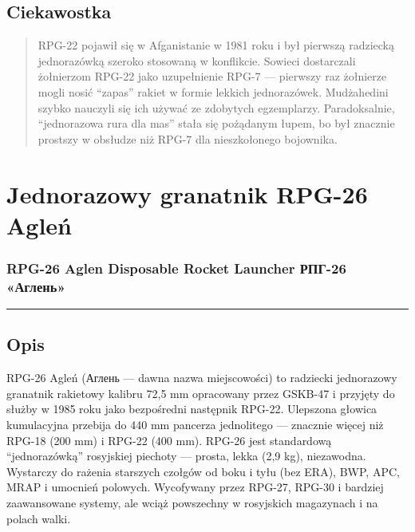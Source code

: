 \documentclass[12pt,openany,oneside]{book}
\begin{document}
\section{Ciekawostka}\label{ciekawostka-70}

\begin{quote}
RPG-22 pojawił się w Afganistanie w 1981 roku i był pierwszą radziecką
jednorazówką szeroko stosowaną w konflikcie. Sowieci dostarczali
żołnierzom RPG-22 jako uzupełnienie RPG-7 --- pierwszy raz żołnierze
mogli nosić ``zapas'' rakiet w formie lekkich jednorazówek. Mudżahedini
szybko nauczyli się ich używać ze zdobytych egzemplarzy. Paradoksalnie,
``jednorazowa rura dla mas'' stała się pożądanym łupem, bo był znacznie
prostszy w obsłudze niż RPG-7 dla nieszkołonego bojownika.
\end{quote}

\chapter{Jednorazowy granatnik RPG-26
Agleń}\label{jednorazowy-granatnik-rpg-26-agleux144}

\subsection{RPG-26 Aglen Disposable Rocket Launcher \textbar{} РПГ-26
«Аглень»}\label{rpg-26-aglen-disposable-rocket-launcher-ux440ux43fux433-26-ux430ux433ux43bux435ux43dux44c}

\begin{center}\rule{0.5\linewidth}{0.5pt}\end{center}

\section{Opis}\label{opis-71}

RPG-26 Agleń (Аглень --- dawna nazwa miejscowości) to radziecki
jednorazowy granatnik rakietowy kalibru 72,5 mm opracowany przez GSKB-47
i przyjęty do służby w 1985 roku jako bezpośredni następnik RPG-22.
Ulepszona głowica kumulacyjna przebija do 440 mm pancerza jednolitego
--- znacznie więcej niż RPG-18 (200 mm) i RPG-22 (400 mm). RPG-26 jest
standardową ``jednorazówką'' rosyjskiej piechoty --- prosta, lekka (2,9
kg), niezawodna. Wystarczy do rażenia starszych czołgów od boku i tyłu
(bez ERA), BWP, APC, MRAP i umocnień polowych. Wycofywany przez RPG-27,
RPG-30 i bardziej zaawansowane systemy, ale wciąż powszechny w
rosyjskich magazynach i na polach walki.
\end{document}
